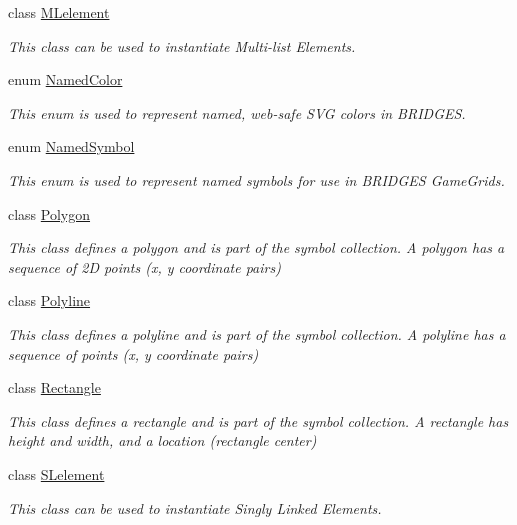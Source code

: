 \begin{DoxyCompactItemize}
class \hyperlink{classbridges_1_1base_1_1_m_lelement}{M\+Lelement}
\begin{DoxyCompactList}\small\item\em This class can be used to instantiate Multi-\/list Elements. \end{DoxyCompactList}\item 
enum \hyperlink{enumbridges_1_1base_1_1_named_color}{Named\+Color}
\begin{DoxyCompactList}\small\item\em This enum is used to represent named, web-\/safe S\+VG colors in B\+R\+I\+D\+G\+ES. \end{DoxyCompactList}\item 
enum \hyperlink{enumbridges_1_1base_1_1_named_symbol}{Named\+Symbol}
\begin{DoxyCompactList}\small\item\em This enum is used to represent named symbols for use in B\+R\+I\+D\+G\+ES Game\+Grids. \end{DoxyCompactList}\item 
class \hyperlink{classbridges_1_1base_1_1_polygon}{Polygon}
\begin{DoxyCompactList}\small\item\em This class defines a polygon and is part of the symbol collection. A polygon has a sequence of 2D points (x, y coordinate pairs) \end{DoxyCompactList}\item 
class \hyperlink{classbridges_1_1base_1_1_polyline}{Polyline}
\begin{DoxyCompactList}\small\item\em This class defines a polyline and is part of the symbol collection. A polyline has a sequence of points (x, y coordinate pairs) \end{DoxyCompactList}\item 
class \hyperlink{classbridges_1_1base_1_1_rectangle}{Rectangle}
\begin{DoxyCompactList}\small\item\em This class defines a rectangle and is part of the symbol collection. A rectangle has height and width, and a location (rectangle center) \end{DoxyCompactList}\item 
class \hyperlink{classbridges_1_1base_1_1_s_lelement}{S\+Lelement}
\begin{DoxyCompactList}\small\item\em This class can be used to instantiate Singly Linked Elements. \end{DoxyCompactList}\item 

\end{DoxyCompactItemize}
